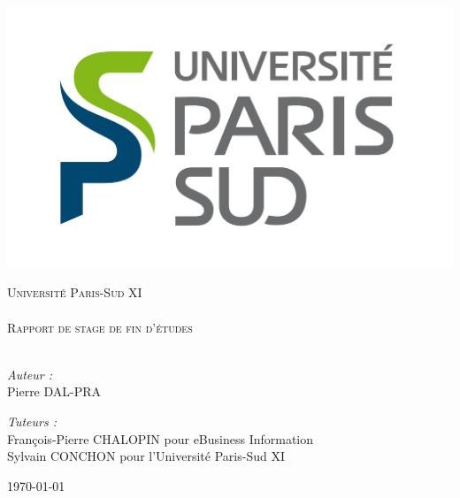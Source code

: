 \begin{titlepage}
	\begin{center}
		\includegraphics[scale=0.75]{./logo_psud.jpg}
				
		\textsc{\Large Université Paris-Sud XI}\\[1.5cm]
		\HRule \\[0.5cm]
		\textsc{\LARGE Rapport de stage de fin d'études}
		\\[0.5cm]
		\HRule	 \\[1.5cm]
		\begin{minipage}[t]{0.4\textwidth}
			\begin{flushleft}
				\emph{Auteur :}\\
				Pierre DAL-PRA
			\end{flushleft}
		\end{minipage}
		\begin{minipage}[t]{0.4\textwidth}
			\begin{flushright}
				\emph{Tuteurs : }\\
				François-Pierre CHALOPIN pour eBusiness Information\\
				Sylvain CONCHON pour l'Université Paris-Sud XI
			\end{flushright}
		\end{minipage}
		\vfill
		{\Large \today}
	\end{center}
\end{titlepage}